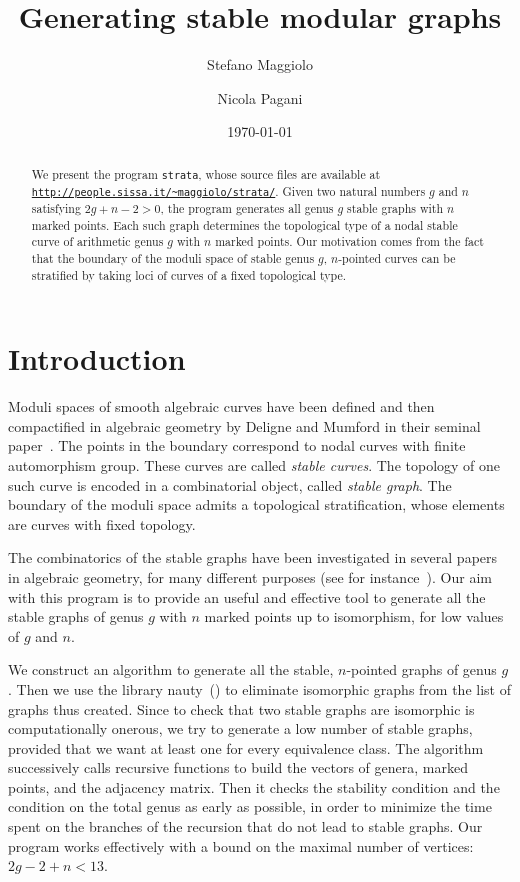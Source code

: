 \documentclass{amsart}
\title{Generating stable modular graphs}
\author{Stefano Maggiolo}
\author{Nicola Pagani}
\date{\today}
\theoremstyle{plain}
\theoremstyle{definition}
\begin{document}
\begin{abstract}
  We present the program \texttt{strata}, whose source files are
  available at \href{http://people.sissa.it/~maggiolo/strata/}
  {\texttt{http://people.sissa.it/\~{}maggiolo/strata/}}. Given two
  natural numbers $g$ and $n$ satisfying $2g+n-2>0$, the program
  generates all genus $g$ stable graphs with $n$ marked points. Each such
  graph determines the topological type of a nodal stable curve of
  arithmetic genus $g$ with $n$ marked points. Our motivation comes
  from the fact that the boundary of the moduli space of stable genus
  $g$, $n$-pointed curves can be stratified by taking loci of curves
  of a fixed topological type.
\end{abstract}

\maketitle
\setcounter{tocdepth}{1}
\tableofcontents


\section{Introduction}
Moduli spaces of smooth algebraic curves have been defined and then
compactified in algebraic geometry by Deligne and Mumford in their
seminal paper~\cite{delignemumford}. The points in the boundary
correspond to nodal curves with finite automorphism group. These
curves are called \emph{stable curves}. The topology of one such curve
is encoded in a combinatorial object, called \emph{stable graph}. The
boundary of the moduli space admits a topological stratification,
whose elements are curves with fixed topology.

The combinatorics of the stable graphs have been investigated in
several papers in algebraic geometry, for many different purposes (see
for instance~\cite{modularoperads,opstall,opstall2,stephanie2}). Our
aim with this program is to provide an useful and effective tool to
generate all the stable graphs of genus $g$ with $n$ marked points up
to isomorphism, for low values of $g$ and $n$.

We construct an algorithm to generate all the stable, $n$-pointed
graphs of genus $g$. Then we use the library nauty~(\cite{nauty}) to
eliminate isomorphic graphs from the list of graphs thus
created. Since to check that two stable graphs are isomorphic is
computationally onerous, we try to generate a low number of stable
graphs, provided that we want at least one for every equivalence
class. The algorithm successively calls recursive functions to build
the vectors of genera, marked points, and the adjacency matrix. Then
it checks the stability condition and the condition on the total genus
as early as possible, in order to minimize the time spent on the
branches of the recursion that do not lead to stable graphs. Our
program works effectively with a bound on the maximal number of
vertices: $2g-2+n<13$.
\end{document}
